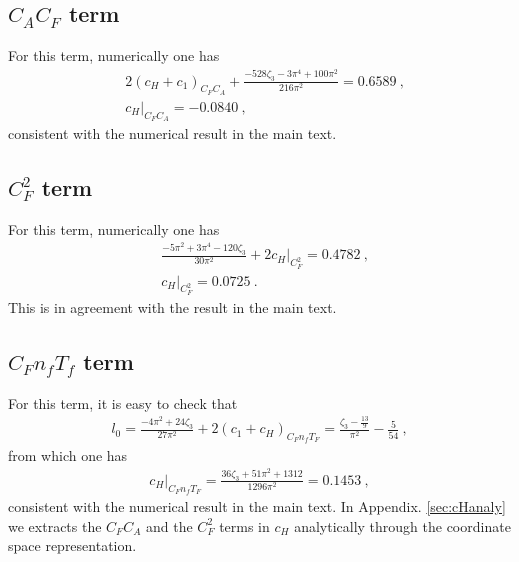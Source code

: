 \documentclass[a4paper,11pt]{article}
\begin{document}
\subsection{$C_AC_F$ term}
For this term, numerically one has
\begin{align}
&2(c_H+c_1)_{C_FC_A}+\frac{-528 \zeta_3 -3\pi ^4+100 \pi ^2}{216 \pi ^2}=0.6589 \ , \\ 
&c_H|_{C_FC_A}=-0.0840 \ ,
\end{align}
consistent with the numerical result in the main text. 
\subsection{$C_F^2$ term}
For this term, numerically one has
\begin{align}
&\frac{-5\pi^2+3\pi^4-120\zeta_3}{30\pi^2}+2c_H|_{C_F^2}=0.4782 \ , \\
&c_H|_{C_F^2}=0.0725 \ .
\end{align}
This is in agreement with the result in the main text.
\subsection{$C_Fn_fT_f$ term}
For this term, it is easy to check that
\begin{align}
l_0=\frac{-4\pi^2+24\zeta_3}{27\pi^2} +2(c_1+c_H)_{C_Fn_fT_F}=\frac{\zeta_3-\frac{13}{9}}{\pi ^2}-\frac{5}{54} \ ,
\end{align}
from which one has
\begin{align}
c_H|_{C_Fn_fT_F}=\frac{36 \zeta_3+51 \pi ^2+1312}{1296 \pi ^2}= 0.1453 \ ,
\end{align}
consistent with the numerical result in the main text.  In Appendix. \ref{sec:cHanaly} we extracts the $C_FC_A$ and the $C_F^2$ terms in $c_H$ analytically through the coordinate space representation. 
\end{document}
